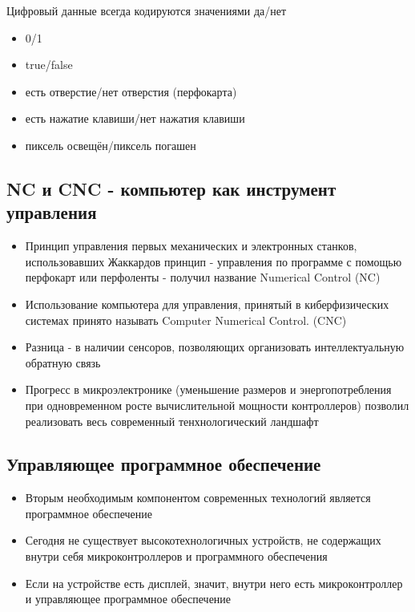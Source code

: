\documentclass{article}
\theoremstyle{problemstyle}
\theoremstyle{ans}
\begin{document}
Цифровый данные всегда кодируются значениями да/нет

\begin{itemize}
    \item 0/1
    \item true/false
    \item есть отверстие/нет отверстия (перфокарта)
    \item есть нажатие клавиши/нет нажатия клавиши
    \item пиксель освещён/пиксель погашен
\end{itemize}


\subsection{NC и CNC - компьютер как инструмент управления}

\begin{itemize}
    \item Принцип управления первых механических и электронных станков, использовавших Жаккардов принцип - управления по программе с помощью перфокарт или перфоленты - получил название Numerical Control (NC)
    \item Использование компьютера для управления, принятый в киберфизических системах принято называть Computer Numerical Control. (CNC)
    \item Разница - в наличии сенсоров, позволяющих организовать интеллектуальную обратную связь
    \item Прогресс в микроэлектронике (уменьшение размеров и энергопотребления при одновременном росте вычислительной мощности контроллеров) позволил реализовать весь современный тенхнологический ландшафт
\end{itemize}


\subsection{Управляющее программное обеспечение}

\begin{itemize}
    \item Вторым необходимым компонентом современных технологий является программное обеспечение
    \item Сегодня не существует высокотехнологичных устройств, не содержащих внутри себя микроконтроллеров и программного обеспечения
    \item Если на устройстве есть дисплей, значит, внутри него есть микроконтроллер и управляющее программное обеспечение
\end{itemize}
\end{document}
